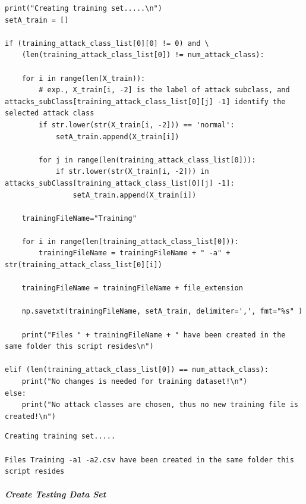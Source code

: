 \begin{verbatim}
print("Creating training set.....\n")
setA_train = []

if (training_attack_class_list[0][0] != 0) and \
    (len(training_attack_class_list[0]) != num_attack_class):

    for i in range(len(X_train)):
        # exp., X_train[i, -2] is the label of attack subclass, and attacks_subClass[training_attack_class_list[0][j] -1] identify the selected attack class
        if str.lower(str(X_train[i, -2])) == 'normal':
            setA_train.append(X_train[i])

        for j in range(len(training_attack_class_list[0])):
            if str.lower(str(X_train[i, -2])) in attacks_subClass[training_attack_class_list[0][j] -1]:
                setA_train.append(X_train[i])

    trainingFileName="Training"

    for i in range(len(training_attack_class_list[0])):
        trainingFileName = trainingFileName + " -a" + str(training_attack_class_list[0][i])

    trainingFileName = trainingFileName + file_extension

    np.savetxt(trainingFileName, setA_train, delimiter=',', fmt="%s" )

    print("Files " + trainingFileName + " have been created in the same folder this script resides\n")

elif (len(training_attack_class_list[0]) == num_attack_class):
    print("No changes is needed for training dataset!\n")
else:
    print("No attack classes are chosen, thus no new training file is created!\n")
\end{verbatim}

\begin{verbatim}
Creating training set.....

Files Training -a1 -a2.csv have been created in the same folder this script resides
\end{verbatim}

\subparagraph{Create Testing Data Set}


